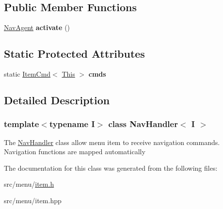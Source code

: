 \subsection*{Public Member Functions}
\begin{DoxyCompactItemize}
\item 
\mbox{\label{classNavHandler_aa3ca001d5ed2723e3b678388fc61ffe0}} 
\hyperlink{structNavAgent}{Nav\+Agent} {\bfseries activate} ()
\end{DoxyCompactItemize}
\subsection*{Static Protected Attributes}
\begin{DoxyCompactItemize}
\item 
\mbox{\label{classNavHandler_ab8a4970b41b11aae9d9d832063aff71f}} 
static \hyperlink{structItemCmd}{Item\+Cmd}$<$ \hyperlink{classNavHandler}{This} $>$ {\bfseries cmds}
\end{DoxyCompactItemize}


\subsection{Detailed Description}
\subsubsection*{template$<$typename I$>$\newline
class Nav\+Handler$<$ I $>$}

The \hyperlink{classNavHandler}{Nav\+Handler} class allow menu item to receive navigation commands. Navigation functions are mapped automatically 

The documentation for this class was generated from the following files\+:\begin{DoxyCompactItemize}
\item 
src/menu/\hyperlink{item_8h}{item.\+h}\item 
src/menu/item.\+hpp\end{DoxyCompactItemize}

